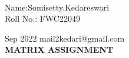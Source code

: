 \documentclass[10pt,a4paper]{report}
\begin{document}
 \vspace{3mm}\\ \raggedleft Name:Somisetty.Kedareswari\vspace{2mm}\\ \raggedleft Roll No.: FWC22049\vspace{2mm}\\ \raggedright Sep 2022 \hspace{12cm} \raggedleft mail2kedari@gmail.com \vspace{10mm}
\\ \centering \Large \textbf{MATRIX ASSIGNMENT} \normalsize \vspace{15mm}
\end{document}
